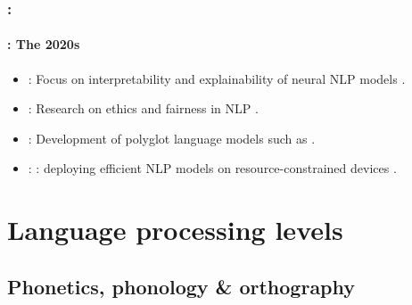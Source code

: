 \documentclass[xcolor=table]{beamer}
\begin{document}
\begin{frame}
	\frametitle{\insertshortsubtitle: \insertsection}
	\framesubtitle{\insertsubsection: The 2020s}
	
	\begin{itemize}
		\item {}: Focus on interpretability and explainability of neural NLP models \cite{2020-belinkov-al,2020-kim-al,2020-jacovi-goldberg}.
		\item {}: Research on ethics and fairness in NLP \cite{2021-garridoMunoz-al,2021-field-al}.
		\item {}: Development of polyglot language models such as  \cite{2022-fu-al}.
		\item {}: : deploying efficient NLP models on resource-constrained devices \cite{2022-guo-al}.
	\end{itemize}
	
\end{frame}

\section{Language processing levels}

\begin{frame}
	\frametitle{\insertshortsubtitle}
	\framesubtitle{\insertsection}

	\begin{center}
	\end{center}

\end{frame}

\subsection{Phonetics, phonology \& orthography}
\end{document}
